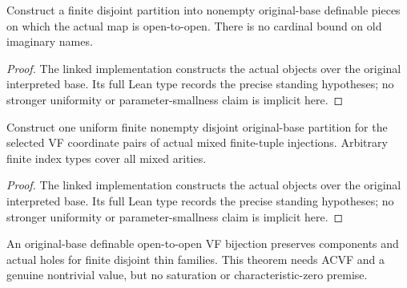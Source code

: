 \begin{proposition}

\label{s3-19}


\leanok

Construct a finite disjoint partition into nonempty original-base definable pieces on which the actual map is open-to-open. There is no cardinal bound on old imaginary names.

\end{proposition}

\begin{proof}


\leanok

The linked implementation constructs the actual objects over the original interpreted base. Its full Lean type records the precise standing hypotheses; no stronger uniformity or parameter-smallness claim is implicit here.

\end{proof}

\begin{proposition}

\label{s3-21}


\leanok

Construct one uniform finite nonempty disjoint original-base partition for the selected VF coordinate pairs of actual mixed finite-tuple injections. Arbitrary finite index types cover all mixed arities.

\end{proposition}

\begin{proof}


\leanok

The linked implementation constructs the actual objects over the original interpreted base. Its full Lean type records the precise standing hypotheses; no stronger uniformity or parameter-smallness claim is implicit here.

\end{proof}

\begin{lemma}

\label{s3-22}


\leanok

An original-base definable open-to-open VF bijection preserves components and actual holes for finite disjoint thin families. This theorem needs ACVF and a genuine nontrivial value, but no saturation or characteristic-zero premise.

\end{lemma}

